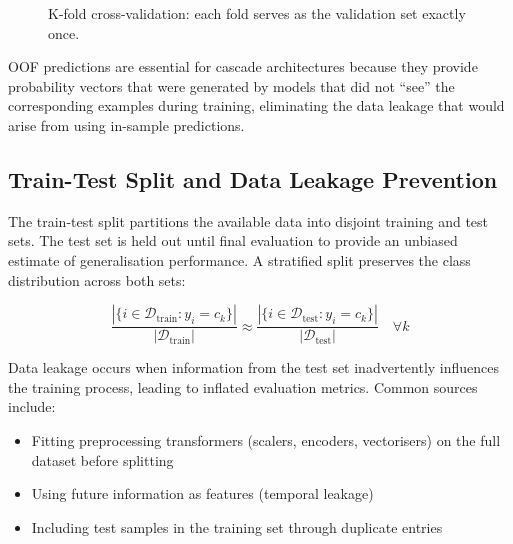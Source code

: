 \documentclass[10pt,a4paper]{article}
\begin{document}
\begin{figure}[H]
    \centering
    \caption{K-fold cross-validation: each fold serves as the validation set exactly once.}
    \label{fig:kfold-cross-validation}
\end{figure}

OOF predictions are essential for cascade architectures because they provide probability vectors that were generated by models that did not ``see'' the corresponding examples during training, eliminating the data leakage that would arise from using in-sample predictions.

\subsection{Train-Test Split and Data Leakage Prevention}
\label{sec:train-test-split}

The train-test split partitions the available data into disjoint training and test sets. The test set is held out until final evaluation to provide an unbiased estimate of generalisation performance. A stratified split preserves the class distribution across both sets:

\begin{equation}
\frac{| \{i \in \mathcal{D}_{\text{train}} : y_i = c_k\} |}{|\mathcal{D}_{\text{train}}|} \approx \frac{| \{i \in \mathcal{D}_{\text{test}} : y_i = c_k\} |}{|\mathcal{D}_{\text{test}}|} \quad \forall k
\label{eq:stratified-split}
\end{equation}

Data leakage occurs when information from the test set inadvertently influences the training process, leading to inflated evaluation metrics. Common sources include:

\begin{itemize}
    \item Fitting preprocessing transformers (scalers, encoders, vectorisers) on the full dataset before splitting
    \item Using future information as features (temporal leakage)
    \item Including test samples in the training set through duplicate entries
\end{itemize}
\end{document}
